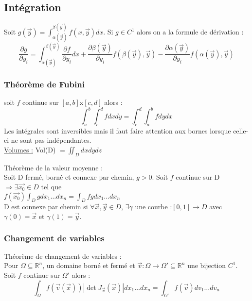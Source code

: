 \documentclass[../main.tex]{subfiles}
\begin{document}
\subsection{Intégration}
Soit $g(\vec{y}) = \int_{\alpha(\vec{y})}^{\beta(\vec{y})} f(x,\vec{y}) dx$. Si $g\in C^1$ alors on a la formule de dérivation :\\
\begin{equation}
    \frac{\partial g}{\partial y_i} = \int_{\alpha(\vec{y})}^{\beta(\vec{y})} \frac{\partial f}{\partial y_i}dx + \frac{\partial \beta(\vec{y})}{\partial y_i}f(\beta(\vec{y}), \vec{y}) - \frac{\partial \alpha(\vec{y})}{\partial y_i}f(\alpha(\vec{y}), \vec{y})
\end{equation}

\subsubsection{Théorème de Fubini}
soit $f$ continue sur $[a,b]$x$[c,d]$ alors :\\
\begin{equation}
    \int_a^b \int^d_c fdxdy = \int^d_c \int_a^b fdydx
\end{equation}
Les intégrales sont inversibles mais il faut faire attention aux bornes lorsque celle-ci ne sont pas indépendantes.\\

\quad \underline{Volumes :} Vol(D) $=\iint_D dxdydz$\\

\begin{theorem}Théorème de la valeur moyenne :\\Soit D fermé, borné et connexe par chemin, $g>0$. Soit $f$ continue sur D$\Rightarrow \exists \vec{x_0} \in D$ tel que \\
$f(\vec{x_0}) \int_D g dx_1 \dots dx_n = \int_D fg dx_1\dots dx_n$\\

D est connexe par chemin si $\forall \vec{x}, \vec{y} \in D$, $\exists \gamma$ une courbe :$[0,1]\rightarrow D$ avec $\gamma(0) = \vec{x}$ et $\gamma(1) = \vec{y}$.
\end{theorem}

\subsubsection{Changement de variables}
\begin{theorem}Théorème de changement de variables :\\Pour $\Omega \subseteq \mathbb{R}^n$, un domaine borné et fermé et $\vec{v} : \Omega \rightarrow \Omega' \subseteq \mathbb{R}^n$ une bijection $C^1$.\\
Soit $f$ continue sur $\Omega'$ alors :\\
\begin{equation}
    \int_{\Omega}f(\vec{v}(\vec{x})) |\det J_{\vec{v}}(\vec{x})|dx_1 \dots dx_n = \int_{\Omega'} f(\vec{v}) dv_1\dots dv_n
\end{equation}
\end{theorem}
\end{document}
